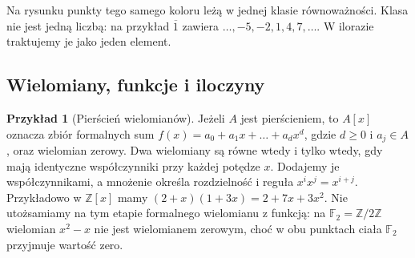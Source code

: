 \documentclass[11pt,a4paper,openany]{report}
\numberwithin{equation}{section}
\theoremstyle{plain}
\theoremstyle{definition}
\newtheorem{przyklad}[twierdzenie]{Przykład}
\theoremstyle{remark}
\newcommand{\Z}{\mathbb Z}
\newcommand{\F}{\mathbb F}
\begin{document}
\begin{center}
\end{center}

Na rysunku punkty tego samego koloru leżą w jednej klasie równoważności.
Klasa nie jest jedną liczbą: na przykład $\overline1$ zawiera
$\dots,-5,-2,1,4,7,\dots$. W ilorazie traktujemy je jako jeden element.

\subsection{Wielomiany, funkcje i iloczyny}

\begin{przyklad}[Pierścień wielomianów]
Jeżeli $A$ jest pierścieniem, to $A[x]$ oznacza zbiór formalnych sum
$f(x)=a_0+a_1x+\dots+a_dx^d$, gdzie $d\ge0$ i $a_j\in A$, oraz wielomian
zerowy. Dwa wielomiany są równe wtedy i tylko wtedy, gdy mają identyczne
współczynniki przy każdej potędze $x$. Dodajemy je współczynnikami,
a mnożenie określa rozdzielność i reguła $x^ix^j=x^{i+j}$.
Przykładowo w $\Z[x]$ mamy
$(2+x)(1+3x)=2+7x+3x^2$.
Nie utożsamiamy na tym etapie formalnego wielomianu z funkcją:
na $\F_2=\Z/2\Z$ wielomian $x^2-x$ nie jest wielomianem zerowym,
choć w obu punktach ciała $\F_2$ przyjmuje wartość zero.
\end{przyklad}
\end{document}
